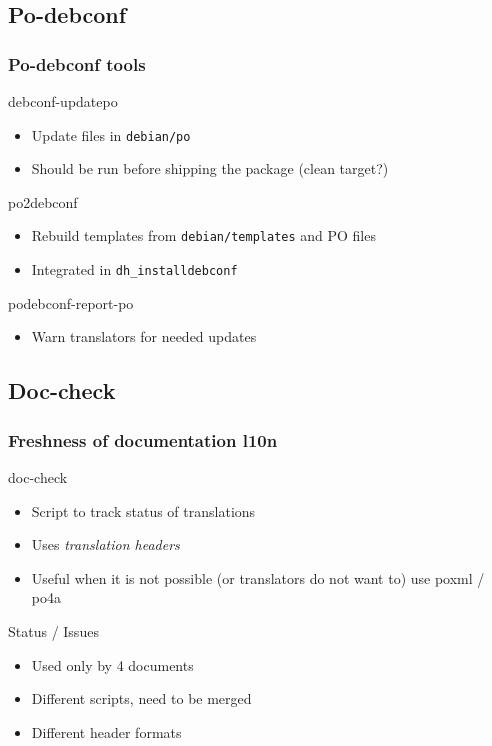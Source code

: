 \documentclass{beamer}
\begin{document}
\subsection{Po-debconf}

\begin{frame}
  \frametitle{Po-debconf tools}
	\begin{block}
		{debconf-updatepo}
		\begin{itemize}
		\item
			{Update files in \texttt{debian/po}}
		\item
			Should be run before shipping the package (clean target?)
		\end{itemize}
	\end{block}
	\begin{block}
		{po2debconf}
		\begin{itemize}
		\item
			Rebuild templates from \texttt{debian/templates} and PO files
		\item
			Integrated in \texttt{dh\_installdebconf}
		\end{itemize}
	\end{block}
	\begin{block}
		{podebconf-report-po}
		\begin{itemize}
		\item
			Warn translators for needed updates
		\end{itemize}
	\end{block}
\end{frame}


\subsection{Doc-check}

\begin{frame}
  \frametitle{Freshness of documentation l10n}
	\begin{block}
		{doc-check}
		\begin{itemize}
		\item Script to track status of translations
		\item Uses {\em translation headers}
		\item Useful when it is not possible (or translators do not want to) use poxml / po4a
		\end{itemize}
	\end{block}
	\begin{block}
		{Status / Issues}
		\begin{itemize}
		\item Used only by 4 documents
		\item Different scripts, need to be merged
		\item Different header formats
		\end{itemize}
	\end{block}
\end{frame}
\end{document}
